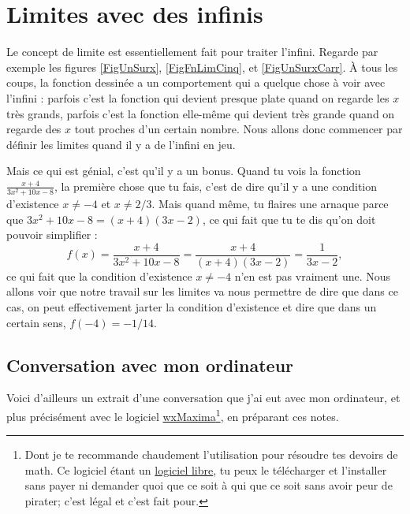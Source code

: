 \documentclass[a4paper,12pt]{book}
\theoremstyle{mes_exemples}	\newtheorem{exemple}[numtho]{Exemple}
\theoremstyle{mes_tho}
\begin{document}
\section{Limites avec des infinis}

Le concept de limite est essentiellement fait pour traiter l'infini. Regarde par exemple les figures \ref{FigUnSurx}, \ref{FigFnLimCinq}, et \ref{FigUnSurxCarr}. À tous les coups, la fonction dessinée a un comportement qui a quelque chose à voir avec l'infini : parfois c'est la fonction qui devient presque plate quand on regarde les $x$ très grands, parfois c'est la fonction elle-même qui devient très grande quand on regarde des $x$ tout proches d'un certain nombre. Nous allons donc commencer par définir les limites quand il y a de l'infini en jeu.

Mais ce qui est génial, c'est qu'il y a un bonus\label{PgBonusLimite}. Quand tu vois la fonction $\frac{ x+4 }{ 3x^2+10x-8 }$, la première chose que tu fais, c'est de dire qu'il y a une condition d'existence $x\neq -4$ et $x\neq 2/3$. Mais quand même, tu flaires une arnaque parce que $3x^2+10x-8=(x+4)(3x-2)$, ce qui fait que tu te dis qu'on doit pouvoir simplifier :
\[ 
 f(x)= \frac{ x+4 }{ 3x^2+10x-8 }=\frac{ x+4 }{ (x+4)(3x-2) }=\frac{ 1 }{ 3x-2 },
\]
ce qui fait que la condition d'existence $x\neq -4$ n'en est pas vraiment une. Nous allons voir que notre travail sur les limites va nous permettre de dire que dans ce cas, on peut effectivement jarter la condition d'existence et dire que dans un certain sens, $f(-4)=-1/14$.

\subsection{Conversation avec mon ordinateur}

Voici d'ailleurs un extrait d'une conversation que j'ai eut avec mon ordinateur, et plus précisément avec le logiciel \href{http://fr.wikipedia.org/wiki/Maxima}{wxMaxima}\footnote{Dont je te recommande chaudement l'utilisation pour résoudre tes devoirs de math. Ce logiciel étant un \href{http://fr.wikipedia.org/wiki/Logiciel_libre}{logiciel libre}, tu peux le télécharger et l'installer sans payer ni demander quoi que ce soit à qui que ce soit sans avoir peur de pirater; c'est légal et c'est fait pour.}, en préparant ces notes.
\end{document}
